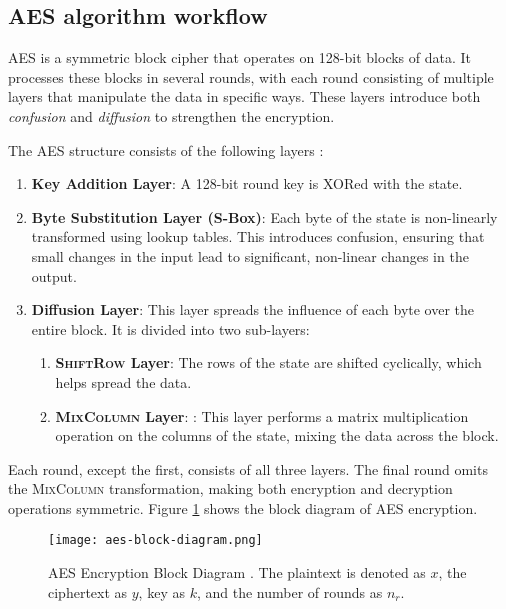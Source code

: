 \subsection{AES algorithm workflow}

\Gls{AES} is a symmetric block cipher that operates on 128-bit blocks of data.
It processes these blocks in several rounds, with each round consisting of multiple layers that manipulate the data in specific ways. 
These layers introduce both \textit{confusion} and \textit{diffusion} to strengthen the encryption.

The AES structure consists of the following layers \cite{Paar2024}:
\begin{enumerate}
    \item \textbf{Key Addition Layer}:
    A 128-bit round key is XORed with the state. 

    \item \textbf{Byte Substitution Layer (S-Box)}:
    Each byte of the state is non-linearly transformed using lookup tables. 
    This introduces confusion, ensuring that small changes in the input lead to significant, non-linear changes in the output.
    
    \item \textbf{Diffusion Layer}:
    This layer spreads the influence of each byte over the entire block. 
    It is divided into two sub-layers:
    \begin{enumerate}
        \item \textbf{\textsc{ShiftRow} Layer}: The rows of the state are shifted cyclically, which helps spread the data. %
        \item \textbf{\textsc{MixColumn} Layer}: : This layer performs a matrix multiplication operation on the columns of the state, mixing the data across the block. %
    \end{enumerate}
\end{enumerate}

Each round, except the first, consists of all three layers. 
The final round omits the \textsc{MixColumn} transformation, making both encryption and decryption operations symmetric.
Figure \ref{fig:aes-block-diagram} shows the block diagram of AES encryption.

\begin{figure}[ht]
    \centering
    \texttt{[image: aes-block-diagram.png]} %
    \caption{
        AES Encryption Block Diagram \cite{Paar2024}.
        The plaintext is denoted as $x$, the ciphertext as $y$, key as $k$, and the number of rounds as $n_r$.
    }
    \label{fig:aes-block-diagram}
\end{figure}